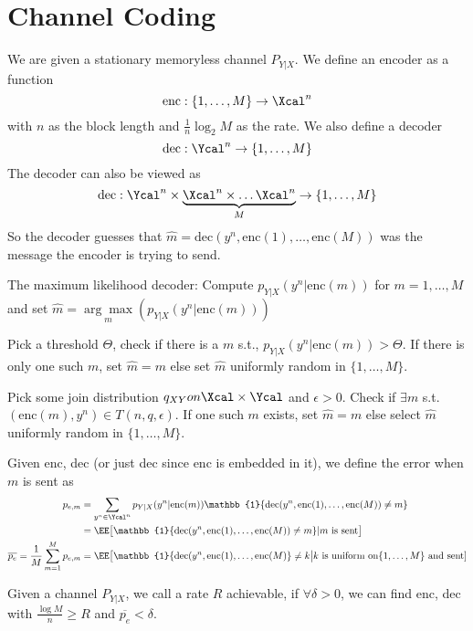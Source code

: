 \section{Channel Coding}
\newcommand{\enc}{\text{enc}}
\newcommand{\dec}{\text{dec}}
We are given a stationary memoryless channel $P_{Y|X}$. We define an encoder as a function
\[\enc: \{1, \dots, M\} \to \Xcal^n\] with $n$ as the block length and $\frac{1}{n} \log_2 M$ as the rate. We also define a decoder
\[\dec: \Ycal^n \to \{1, \dots, M\}\]
The decoder can also be viewed as
\[\dec: \Ycal^n \times \underbrace{\Xcal^n \times \dots \Xcal^n}_M \to \{1, \dots, M\}\]
So the decoder guesses that $\hat{m} = \dec(y^n, \enc(1), \dots, \enc(M))$ was the message the encoder is trying to send.
\begin{eg}
    The maximum likelihood decoder: Compute $p_{Y|X}(y^n | \enc(m))$ for $m = 1, \dots, M$ and set $\hat{m} = \underset{m}{\arg\max}(p_{Y|X}(y^n | \enc(m)))$
\end{eg}
\begin{eg}
    Pick a threshold $\Theta$, check if there is a $m$ s.t., $p_{Y|X}(y^n|\enc(m)) > \Theta$. If there is only one such $m$, set $\hat{m} = m$ else set $\hat{m}$ uniformly random in $\{1, \dots, M\}$.
\end{eg}
\begin{eg}
    Pick some join distribution $q_{XY} on \Xcal \times \Ycal$ and $\epsilon > 0$. Check if $\exists m$ s.t. $(\enc(m), y^n) \in T(n,q,\epsilon)$. If one such $m$ exists, set $\hat{m} = m$ else select $\hat{m}$ uniformly random in $\{1, \dots, M\}$.
\end{eg}
Given enc, dec (or just dec since enc is embedded in it), we define the error when $m$ is sent as
\begin{align*}
    p_{e,m} &= \sum_{y^n \in \Ycal^n} p_{Y|X}(y^n|\enc(m))\mathbb{1}\{\dec(y^n, \enc(1), \dots, \enc(M)) \neq m\} \\
    &= \EE\big[\mathbb{1}\{\dec(y^n, \enc(1), \dots, \enc(M)) \neq m\}|m\text{ is sent}\big] \\
    \overline{p_e} = \frac{1}{M} \sum_{m=1}^M p_{e,m} &= \EE\big[\mathbb{1}\{\dec(y^n, \enc(1), \dots, \enc(M)\} \neq k\big | k \text{ is uniform on} \{1, \dots, M\} \text{ and sent}]
\end{align*}
\begin{definition}
Given a channel $P_{Y|X}$, we call a rate $R$ achievable, if $\forall \delta > 0$, we can find enc, dec with $\frac{\log M}{n} \geq R$ and $\overline{p_e} < \delta$.
\end{definition}
